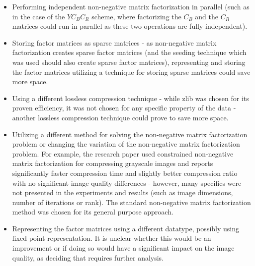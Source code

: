 \documentclass[thesis=M,english]{FITthesis}[2012/10/20]
\begin{document}
\begin{itemize}
  \item Performing independent non-negative matrix factorization in parallel
  (such as in the case of the $YC_BC_R$ scheme, where factorizing the $C_B$
  and the $C_R$ matrices could run in parallel as these two operations are
  fully independent).
  \item Storing factor matrices as sparse matrices - as non-negative matrix
  factorization creates sparse factor matrices (and the seeding technique
  which was used should also create sparse factor matrices), representing
  and storing the factor matrices utilizing a technique for storing sparse
  matrices could save more space.
  \item Using a different lossless compression technique - while zlib was
  chosen for its proven efficiency, it was not chosen for any specific property
  of the data - another lossless compression technique could prove to save
  more space.
  \item Utilizing a different method for solving the non-negative matrix factorization
  problem or changing the variation of the non-negative matrix factorization problem.
  For example, the research paper \cite{imgcnmf} used constrained non-negative matrix factorization for
  compressing grayscale images and reports significantly faster compression time and slightly
  better compression ratio with no significant image quality differences - however, many specifics
  were not presented in the experiments and results (such as image dimensions, number
  of iterations or rank). The standard non-negative matrix factorization method was
  chosen for its general purpose approach.
  \item Representing the factor matrices using a different datatype, possibly using fixed point
  representation. It is unclear whether this would be an improvement or if doing so would
  have a significant impact on the image quality, as deciding that requires further analysis.
\end{itemize}


\end{document}
